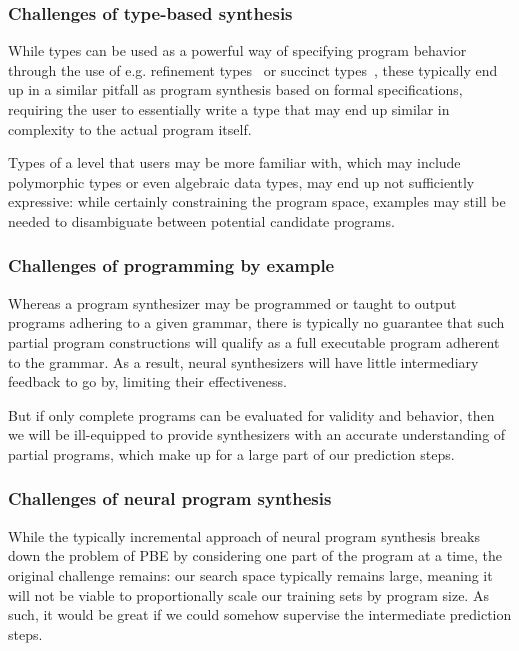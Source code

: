 \documentclass{article}
\begin{document}
\subsubsection{Challenges of type-based synthesis}

While types can be used as a powerful way of specifying program behavior through the use of e.g. refinement types~\citep{synquid} or succinct types~\citep{guospeeding},
these typically end up in a similar pitfall as program synthesis based on formal specifications,
requiring the user to essentially write a type that may end up similar in complexity to the actual program itself.

Types of a level that users may be more familiar with, which may include polymorphic types or even algebraic data types,
may end up not sufficiently expressive: while certainly constraining the program space,
examples may still be needed to disambiguate between potential candidate programs.

\subsubsection{Challenges of programming by example}

Whereas a program synthesizer may be programmed or taught to output programs adhering to a given grammar,
there is typically no guarantee that such partial program constructions will qualify as a full executable program adherent to the grammar.
As a result, neural synthesizers will have little intermediary feedback to go by, limiting their effectiveness.

But if only complete programs can be evaluated for validity and behavior, then 
we will be ill-equipped to provide synthesizers with an accurate understanding of partial programs,
which make up for a large part of our prediction steps.

\subsubsection{Challenges of neural program synthesis}

While the typically incremental approach of neural program synthesis breaks down the problem of PBE by considering one part of the program at a time, the original challenge remains:
our search space typically remains large, meaning it will not be viable to proportionally scale our training sets by program size.
As such, it would be great if we could somehow supervise the intermediate prediction steps.
\end{document}
